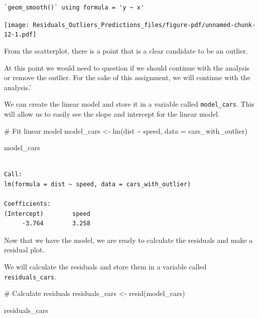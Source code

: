 \documentclass[
  letterpaper,
  DIV=11,
  numbers=noendperiod]{scrreprt}
\newenvironment{Shaded}{\begin{snugshade}}{\end{snugshade}}
\newcommand{\AttributeTok}[1]{\textcolor[rgb]{0.40,0.45,0.13}{#1}}
\newcommand{\CommentTok}[1]{\textcolor[rgb]{0.37,0.37,0.37}{#1}}
\newcommand{\FunctionTok}[1]{\textcolor[rgb]{0.28,0.35,0.67}{#1}}
\newcommand{\NormalTok}[1]{\textcolor[rgb]{0.00,0.23,0.31}{#1}}
\newcommand{\OtherTok}[1]{\textcolor[rgb]{0.00,0.23,0.31}{#1}}
\newcommand{\SpecialCharTok}[1]{\textcolor[rgb]{0.37,0.37,0.37}{#1}}
\begin{document}
\begin{verbatim}
`geom_smooth()` using formula = 'y ~ x'
\end{verbatim}

\texttt{[image: Residuals\_Outliers\_Predictions\_files/figure-pdf/unnamed-chunk-12-1.pdf]}

From the scatterplot, there is a point that is a clear candidate to be
an outlier.

At this point we would need to question if we should continue with the
analysis or remove the outlier. For the sake of this assignment, we will
continue with the analysis.'

We can create the linear model and store it in a variable called
\texttt{model\_cars}. This will allow us to easily see the slope and
intercept for the linear model.

\begin{Shaded}
\begin{Highlighting}[]
\CommentTok{\# Fit linear model}
\NormalTok{model\_cars }\OtherTok{\textless{}{-}} \FunctionTok{lm}\NormalTok{(dist }\SpecialCharTok{\textasciitilde{}}\NormalTok{ speed, }\AttributeTok{data =}\NormalTok{ cars\_with\_outlier)}

\NormalTok{model\_cars}
\end{Highlighting}
\end{Shaded}

\begin{verbatim}

Call:
lm(formula = dist ~ speed, data = cars_with_outlier)

Coefficients:
(Intercept)        speed  
     -3.764        3.258  
\end{verbatim}

Now that we have the model, we are ready to calculate the residuals and
make a residual plot.

We will calculate the residuals and store them in a variable called
\texttt{residuals\_cars}.

\begin{Shaded}
\begin{Highlighting}[]
\CommentTok{\# Calculate residuals}
\NormalTok{residuals\_cars }\OtherTok{\textless{}{-}} \FunctionTok{resid}\NormalTok{(model\_cars)}

\NormalTok{residuals\_cars}
\end{Highlighting}
\end{Shaded}
\end{document}
